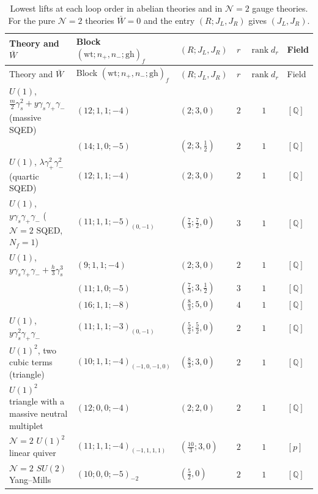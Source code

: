 \documentclass[11pt]{article}
\numberwithin{equation}{section}
\numberwithin{figure}{section}
\numberwithin{table}{section}
\begin{document}
{\footnotesize\renewcommand{\arraystretch}{1.3}\setlength{\tabcolsep}{3.5pt}
\begin{xltabular}{\linewidth}{|>{\raggedright\arraybackslash}X|l|l|c|c|l|}
\caption{Lowest lifts at each loop order in abelian theories and in $\mathcal N=2$ gauge theories. For the pure $\mathcal N=2$ theories $\bar W=0$ and the entry $(R;J_L,J_R)$ gives $(J_L,J_R)$.}\label{local-ch9-higher-lifts}\\
\hline
Theory and $\bar W$ & Block $(\mathrm{wt};n_+,n_-;\mathrm{gh})_f$ & $(R;J_L,J_R)$ & $r$ & $\operatorname{rank}d_r$ & Field\\
\hline\endfirsthead
\hline
Theory and $\bar W$ & Block $(\mathrm{wt};n_+,n_-;\mathrm{gh})_f$ & $(R;J_L,J_R)$ & $r$ & $\operatorname{rank}d_r$ & Field\\
\hline\endhead
$U(1)$, $\tfrac m2\gamma_s^2+y\gamma_s\gamma_+\gamma_-$ (massive SQED) & $(12;1,1;-4)$ & $(2;3,0)$ & $2$ & $1$ & $[\mathbb Q]$\\
 & $(14;1,0;-5)$ & $(2;3,\tfrac12)$ & $2$ & $1$ & $[\mathbb Q]$\\
\hline
$U(1)$, $\lambda\gamma_+^2\gamma_-^2$ (quartic SQED) & $(12;1,1;-4)$ & $(2;3,0)$ & $2$ & $1$ & $[\mathbb Q]$\\
\hline
$U(1)$, $y\gamma_s\gamma_+\gamma_-$ ($\mathcal N=2$ SQED, $N_f=1$) & $(11;1,1;-5)_{(0,-1)}$ & $(\tfrac73;\tfrac72,0)$ & $3$ & $1$ & $[\mathbb Q]$\\
\hline
$U(1)$, $y\gamma_s\gamma_+\gamma_-+\tfrac h3\gamma_s^3$ & $(9;1,1;-4)$ & $(2;3,0)$ & $2$ & $1$ & $[\mathbb Q]$\\
 & $(11;1,0;-5)$ & $(\tfrac73;3,\tfrac12)$ & $3$ & $1$ & $[\mathbb Q]$\\
 & $(16;1,1;-8)$ & $(\tfrac83;5,0)$ & $4$ & $1$ & $[\mathbb Q]$\\
\hline
$U(1)$, $y\gamma_s^2\gamma_+\gamma_-$ & $(11;1,1;-3)_{(0,-1)}$ & $(\tfrac52;\tfrac52,0)$ & $2$ & $1$ & $[\mathbb Q]$\\
\hline
$U(1)^2$, two cubic terms (triangle) & $(10;1,1;-4)_{(-1,0,-1,0)}$ & $(\tfrac83;3,0)$ & $2$ & $1$ & $[\mathbb Q]$\\
\hline
$U(1)^2$ triangle with a massive neutral multiplet & $(12;0,0;-4)$ & $(2;2,0)$ & $2$ & $1$ & $[\mathbb Q]$\\
\hline
$\mathcal N=2$ $U(1)^2$ linear quiver & $(11;1,1;-4)_{(-1,1,1,1)}$ & $(\tfrac{10}3;3,0)$ & $2$ & $1$ & $[p]$\\
\hline
$\mathcal N=2$ $SU(2)$ Yang--Mills & $(10;0,0;-5)_{-2}$ & $(\tfrac52,0)$ & $2$ & $1$ & $[\mathbb Q]$\\

\end{xltabular}}
\end{document}
